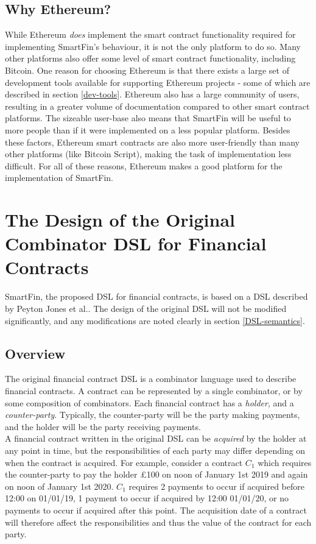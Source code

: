 \subsection{Why Ethereum?}

While Ethereum \textit{does} implement the smart contract functionality required for implementing Smart\-Fin's behaviour, it is not the only platform to do so. Many other platforms also offer some level of smart contract functionality, including Bitcoin\cite{ASC}. One reason for choosing Ethereum is that there exists a large set of development tools available for supporting Ethereum projects - some of which are described in section \ref{dev-tools}. Ethereum also has a large community of users, resulting in a greater volume of documentation compared to other smart contract platforms. The sizeable user-base also means that SmartFin will be useful to more people than if it were implemented on a less popular platform. Besides these factors, Ethereum smart contracts are also more user-friendly than many other platforms (like Bitcoin Script), making the task of implementation less difficult. For all of these reasons, Ethereum makes a good platform for the implementation of SmartFin.

\section{The Design of the Original Combinator DSL for Financial Contracts} \label{DSL-design}

SmartFin, the proposed DSL for financial contracts, is based on a DSL described by Peyton Jones et al.\cite{SPJ}. The design of the original DSL will not be modified significantly, and any modifications are noted clearly in section \ref{DSL-semantics}.

\subsection{Overview} \label{DSL-overview}

The original financial contract DSL is a combinator language used to describe financial contracts. A contract can be represented by a single combinator, or by some composition of combinators. Each financial contract has a \textit{holder}, and a \textit{counter-party}. Typically, the counter-party will be the party making payments, and the holder will be the party receiving payments. \\

A financial contract written in the original DSL can be \textit{acquired} by the holder at any point in time, but the responsibilities of each party may differ depending on when the contract is acquired. For example, consider a contract $C_1$ which requires the counter-party to pay the holder £100 on noon of January 1st 2019 and again on noon of January 1st 2020. $C_1$ requires 2 payments to occur if acquired before 12:00 on 01/01/19, 1 payment to occur if acquired by 12:00 01/01/20, or no payments to occur if acquired after this point. The acquisition date of a contract will therefore affect the responsibilities and thus the value of the contract for each party. \\

